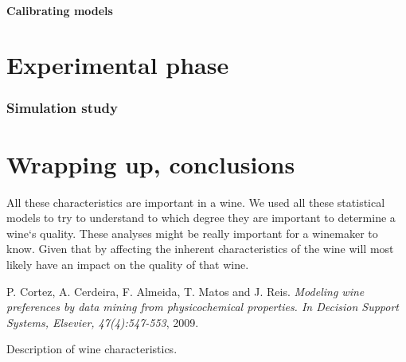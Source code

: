 \documentclass[11pt]{article}
\begin{document}
\subsection{Calibrating models}\label{subsec:calibrating-models}


\part{Experimental phase} \label{part:experimenting}

\section{Simulation study}\label{sec:simulation-study}




\part{Wrapping up, conclusions} \label{part:conclusions}


All these characteristics are important in a wine.
We used all these statistical models to try to understand to which degree they are important
to determine a wine`s quality.
These analyses might be really important for a winemaker to know.
Given that by affecting the inherent characteristics of the wine will most likely have an
impact on the quality of that wine.





\begin{thebibliography}{1}
 P. Cortez, A. Cerdeira, F. Almeida, T. Matos and J. Reis. {\em Modeling wine preferences by data mining from physicochemical properties.
In Decision Support Systems, Elsevier, 47(4):547-553},  2009.
\end{thebibliography}


\clearpage
\begin{table}
    \centering
    \caption{Description of wine characteristics.}
    \resizebox{\columnwidth}{!}{
    
    }
    \label{tab:description_wine}
\end{table}
\end{document}
